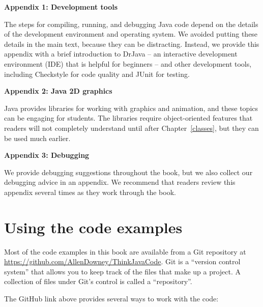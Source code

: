 \documentclass[12pt]{book}
\theoremstyle{exercise}
\begin{document}
\begin{description}

\item{\bf Appendix 1: Development tools}

The steps for compiling, running, and debugging Java code depend on the details of the development environment and operating system.
We avoided putting these details in the main text, because they can be distracting.
Instead, we provide this appendix with a brief introduction to DrJava -- an interactive development environment (IDE) that is helpful for beginners -- and other development tools, including Checkstyle for code quality and JUnit for testing.

\item{\bf Appendix 2: Java 2D graphics}

Java provides libraries for working with graphics and animation, and these topics can be engaging for students.
The libraries require object-oriented features that readers will not completely understand until after Chapter~\ref{classes}, but they can be used much earlier.

\item{\bf Appendix 3: Debugging}

We provide debugging suggestions throughout the book, but we also collect our debugging advice in an appendix.
We recommend that readers review this appendix several times as they work through the book.

\end{description}


\section*{Using the code examples}
\label{code}

Most of the code examples in this book are available from a Git repository at \url{https://github.com/AllenDowney/ThinkJavaCode}.
Git is a ``version control system'' that allows you to keep track of the files that make up a project.
A collection of files under Git's control is called a ``repository''.


The GitHub link above provides several ways to work with the code:
\end{document}
